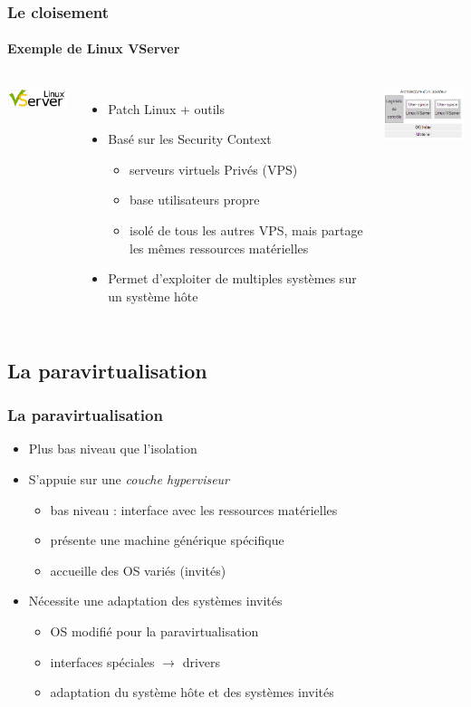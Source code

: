 \begin{frame}
\frametitle{Le cloisement}
\framesubtitle{Exemple de Linux VServer} 
\begin{columns}
\includegraphics[width=3cm]{../illustration/VServer.png}
\begin{itemize}
\item Patch Linux + outils
\item Basé sur les Security Context
\begin{itemize}
\item serveurs virtuels Privés (VPS)
\item base utilisateurs propre
\item isolé de tous les autres VPS, mais partage les mêmes ressources matérielles
\end{itemize}
\item Permet d'exploiter de multiples systèmes sur un système hôte
\end{itemize}
\includegraphics[width=4cm]{../illustration/VServer-archi.png}
\end{columns}
\end{frame}



\subsection{La paravirtualisation}

\begin{frame}
\frametitle{La paravirtualisation}
\begin{itemize}
\item Plus bas niveau que l'isolation
\item S’appuie sur une \emph{couche hyperviseur}
\begin{itemize}
\item bas niveau : interface avec les ressources matérielles
\item présente une machine générique spécifique
\item accueille des OS variés (invités)
\end{itemize}
\item <2>Nécessite une adaptation des systèmes invités
\begin{itemize}
\item OS modifié pour la paravirtualisation
\item interfaces spéciales $\rightarrow$ drivers
\item adaptation du système hôte et des systèmes invités
\end{itemize}
\end{itemize}
\end{frame}


